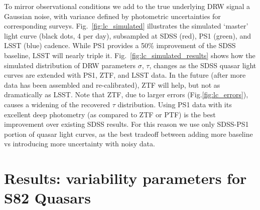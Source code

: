\documentclass[twocolumn]{aastex62}
\newcommand{\project}[1]{\textsf{#1}}
\begin{document}
To mirror observational conditions we add to the true underlying DRW signal a Gaussian noise, with variance defined by photometric uncertainties for corresponding surveys. Fig.~\ref{fig:lc_simulated} illustrates the simulated `master' light curve (black dots, 4 per day), subsampled at SDSS (red), PS1 (green), and LSST (blue) cadence. While PS1 provides a 50\% improvement of the SDSS baseline, LSST will nearly triple it. Fig.~\ref{fig:lc_simulated_results} shows how the simulated distribution of DRW parameters $\sigma$, $\tau$, changes as the SDSS quasar light curves are extended with PS1, ZTF, and LSST data. In the future (after more data has been assembled and re-calibrated), ZTF will help, but not as dramatically as LSST. Note that ZTF, due to larger errors (Fig.\ref{fig:lc_errors}), causes a widening of the recovered $\tau$ distribution. Using PS1 data with its excellent  deep photometry (as compared to ZTF or PTF) is the best improvement over existing SDSS results.  For this reason we use only SDSS-PS1 portion of quasar light curves, as the best tradeoff between adding more baseline vs introducing more uncertainty with noisy data.

\begin{figure*}  %
	\caption{The ratio of DRW parameters fitted with \project{celerite}: $\tau$ and $\sigma$, to the input $\tau_{in} = 575 $d, $\sigma_{in} = 0.2 / \sqrt{2} {\sim} 0.14$  (SF$_{\infty}=0.2$ mag). We simulated 9258 `master' light curves, and  subsampled at real SDSS r-band or PS1 r-band cadence and photometric uncertainties, and simulated ZTF and LSST cadence. To simulate observing conditions, the underlying DRW signal was convolved with a Gaussian noise corresponding to epochal errors. 
	For each light curve we start with SDSS segment only, and as we add more segments (PS1, ZTF, LSST), we refit for DRW model parameters with \project{celerite}. Thus
	each distribution corresponds to a different segment of simulated  combined SDSS-PS1-ZTF-LSST light curves. Extending the baseline shifts the distribution of recovered DRW parameters towards unbiased regime - vertical dashed line marks input matching the output. This corresponds to the upper-right (well-constrained) portion of Fig.~\ref{fig:rho_space}.}
	\label{fig:lc_simulated_results}
\end{figure*} 


%
%
%
%
%
%

\section{Results: variability parameters for S82 Quasars}\label{sec:results}
\end{document}

